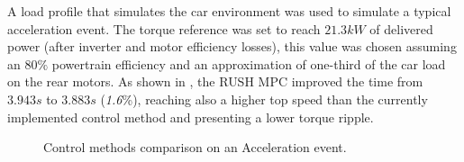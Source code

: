 \documentclass[9pt,conference]{IEEEtran}
\begin{document}
A load profile that simulates the car environment was used to simulate a typical acceleration event. The torque reference was set to reach $21.3kW$ of delivered power (after inverter and motor efficiency losses), this value was chosen assuming an $80\%$ powertrain efficiency and an approximation of one-third of the car load on the rear motors. As shown in , the RUSH MPC improved the time from $3.943s$ to $3.883s$ (\textit{1.6}\%), reaching also a higher top speed than the currently implemented control method and presenting a lower torque ripple.
\patchcmd{\subfigmatrix}{\hfill}{\hspace{0.2cm}}{}{}
\begin{figure}[!htb]
	\centering
	\begin{subfigmatrix}{2}
	\end{subfigmatrix}
	\begin{subfigmatrix}{2}
	\end{subfigmatrix}
	\caption[Control methods comparison on an Acceleration event.]{Control methods comparison on an Acceleration event.}
	\label{fig:acceleration_comparison} %
\end{figure}
\end{document}
